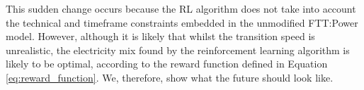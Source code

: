 \documentclass{article}
\begin{document}
This sudden	 change occurs because the RL algorithm does not take into account the technical and timeframe constraints embedded in the unmodified FTT:Power model. However, although it is likely that whilst the transition speed is unrealistic, the electricity mix found by the reinforcement learning algorithm is likely to be optimal, according to the reward function defined in Equation \ref{eq:reward_function}. We, therefore, show what the future should look like.



\end{document}
